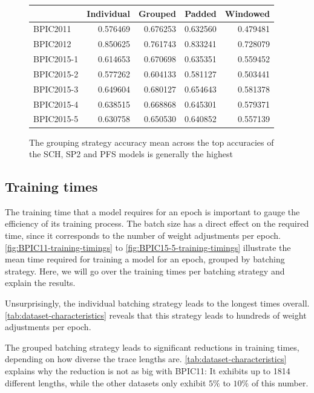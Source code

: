 \begin{figure}
\centering
\begin{tabular}{l|rrrr}
&  Individual &   Grouped &    Padded &  Windowed \\
\midrule
BPIC2011   &    0.576469 &  0.676253 &  0.632560 &  0.479481 \\
BPIC2012   &    0.850625 &  0.761743 &  0.833241 &  0.728079 \\
BPIC2015-1 &    0.614653 &  0.670698 &  0.635351 &  0.559452 \\
BPIC2015-2 &    0.577262 &  0.604133 &  0.581127 &  0.503441 \\
BPIC2015-3 &    0.649604 &  0.680127 &  0.654643 &  0.581378 \\
BPIC2015-4 &    0.638515 &  0.668868 &  0.645301 &  0.579371 \\
BPIC2015-5 &    0.630758 &  0.650530 &  0.640852 &  0.557139 \\
\end{tabular}
\caption[Grouping strategy leads to best mean accuracies]{The grouping strategy accuracy mean across the top accuracies of the SCH, SP2 and PFS models is generally the highest}
\label{tab:strategy-top-accuracies}
\end{figure}
\FloatBarrier

\subsection*{Training times}
The training time that a model requires for an epoch is important to gauge the efficiency of its training process. The batch size has a direct effect on the required time, since it corresponds to the number of weight adjustments per epoch. \autoref{fig:BPIC11-training-timings} to \autoref{fig:BPIC15-5-training-timings} illustrate the mean time required for training a model for an epoch, grouped by batching strategy. Here, we will go over the training times per batching strategy and explain the results.

Unsurprisingly, the individual batching strategy leads to the longest times overall. \autoref{tab:dataset-characteristics} reveals that this strategy leads to hundreds of weight adjustments per epoch.

The grouped batching strategy leads to significant reductions in training times, depending on how diverse the trace lengths are. \autoref{tab:dataset-characteristics} explains why the reduction is not as big with BPIC11: It exhibits up to 1814 different lengths, while the other datasets only exhibit $5\%$ to $10\%$ of this number.

